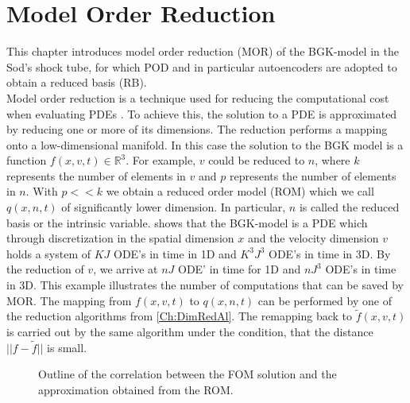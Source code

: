 
\chapter{Model Order Reduction}
\label{Ch:ROM}

This chapter introduces model order reduction (MOR) of the BGK-model in the Sod's shock tube, for which POD and in particular autoencoders are adopted to obtain a reduced basis (RB).\\
Model order reduction is a technique used for reducing the computational cost when evaluating PDEs \cite{Bernard}\cite{Carlberg}\cite{ohlberger2015reduced}. To achieve this, the solution to a PDE is approximated by reducing one or more of its dimensions. The reduction performs a mapping onto a low-dimensional manifold. In this case the solution to the BGK model is a function \(f(x,v,t) \in \mathbb{R}^3\). For example,  \(v\) could be reduced to \(n\), where \(k\) represents the number of elements in \(v\) and \(p\) represents the number of elements in \(n\). With \(p << k\) we obtain a reduced order model (ROM) which we call \(q(x,n,t)\) of significantly lower dimension. In particular, \(n\) is called the reduced basis or the intrinsic variable.  shows that the BGK-model is a PDE which through discretization in the spatial dimension \(x\) and the velocity dimension \(v\) holds a system of \(KJ\) ODE's in time in 1D and \(K^3J^3\) ODE's in time in 3D.  By the reduction of \(v\), we arrive at \(nJ\) ODE' in time for 1D and \(nJ^3\) ODE's in time in 3D. This example illustrates the number of computations that can be saved by MOR. The mapping from \(f(x,v,t)\) to \(q(x,n,t)\) can be performed by one of the reduction algorithms from \cref{Ch:DimRedAl}. The remapping back to \(\tilde{f}(x,v,t)\) is carried out by the same algorithm under the condition, that the distance \(||f - \tilde{f}||\) is small.\\
\begin{figure}[H]
	\begin{subfigure}{.45\textwidth}
		\centering
		
	\end{subfigure}\hfill
	\begin{subfigure}{.45\textwidth}
		\centering
		
	\end{subfigure}
	\caption{Outline of the correlation between the FOM solution and the approximation obtained from the ROM.}
\end{figure}
